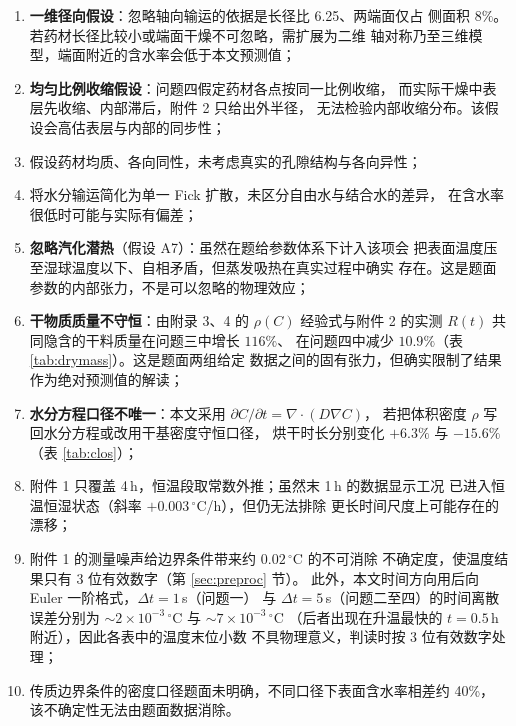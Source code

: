 \documentclass[12pt,a4paper,fontset=none]{ctexart}
\begin{document}
\begin{enumerate}
  \item \textbf{一维径向假设}：忽略轴向输运的依据是长径比 6.25、两端面仅占
        侧面积 $8\%$。若药材长径比较小或端面干燥不可忽略，需扩展为二维
        轴对称乃至三维模型，端面附近的含水率会低于本文预测值；
  \item \textbf{均匀比例收缩假设}：问题四假定药材各点按同一比例收缩，
        而实际干燥中表层先收缩、内部滞后，附件 2 只给出外半径，
        无法检验内部收缩分布。该假设会高估表层与内部的同步性；
  \item 假设药材均质、各向同性，未考虑真实的孔隙结构与各向异性；
  \item 将水分输运简化为单一 Fick 扩散，未区分自由水与结合水的差异，
        在含水率很低时可能与实际有偏差；
  \item \textbf{忽略汽化潜热}（假设 A7）：虽然在题给参数体系下计入该项会
        把表面温度压至湿球温度以下、自相矛盾，但蒸发吸热在真实过程中确实
        存在。这是题面参数的内部张力，不是可以忽略的物理效应；
  \item \textbf{干物质质量不守恒}：由附录 3、4 的 $\rho(C)$ 经验式与附件 2
        的实测 $R(t)$ 共同隐含的干料质量在问题三中增长 $116\%$、
        在问题四中减少 $10.9\%$（表 \ref{tab:drymass}）。这是题面两组给定
        数据之间的固有张力，但确实限制了结果作为绝对预测值的解读；
  \item \textbf{水分方程口径不唯一}：本文采用
        $\partial C/\partial t=\nabla\!\cdot\!(D\nabla C)$，
        若把体积密度 $\rho$ 写回水分方程或改用干基密度守恒口径，
        烘干时长分别变化 $+6.3\%$ 与 $-15.6\%$（表 \ref{tab:clos}）；
  \item 附件 1 只覆盖 4\,h，恒温段取常数外推；虽然末 1\,h 的数据显示工况
        已进入恒温恒湿状态（斜率 $+0.003\,^\circ$C/h），但仍无法排除
        更长时间尺度上可能存在的漂移；
  \item 附件 1 的测量噪声给边界条件带来约 $0.02\,^\circ$C 的不可消除
        不确定度，使温度结果只有 3 位有效数字（第 \ref{sec:preproc} 节）。
        此外，本文时间方向用后向 Euler 一阶格式，$\Delta t=1$\,s（问题一）
        与 $\Delta t=5$\,s（问题二至四）的时间离散误差分别为
        $\sim2\times10^{-3}\,^\circ$C 与 $\sim7\times10^{-3}\,^\circ$C
        （后者出现在升温最快的 $t=0.5$\,h 附近），因此各表中的温度末位小数
        不具物理意义，判读时按 3 位有效数字处理；
  \item 传质边界条件的密度口径题面未明确，不同口径下表面含水率相差约 40\%，
       该不确定性无法由题面数据消除。
\end{enumerate}
\end{document}
